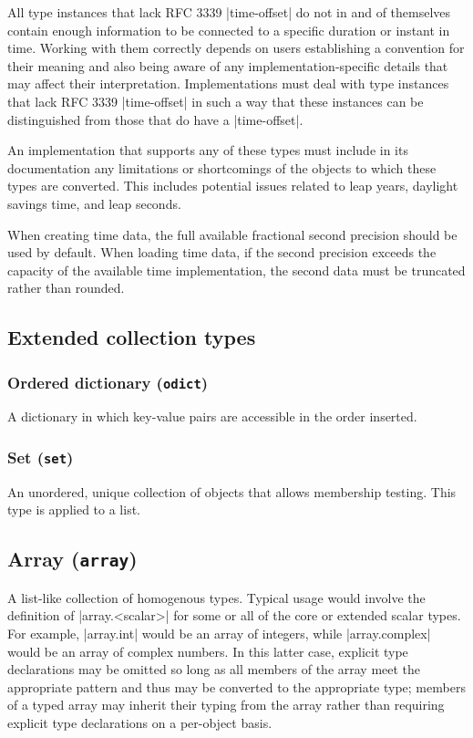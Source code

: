 \documentclass[11pt]{article}
\begin{document}
All type instances that lack RFC 3339 |time-offset| do not in and of themselves contain enough information to be connected to a specific duration or instant in time.  Working with them correctly depends on users establishing a convention for their meaning and also being aware of any implementation-specific details that may affect their interpretation.  Implementations must deal with type instances that lack RFC 3339 |time-offset| in such a way that these instances can be distinguished from those that do have a |time-offset|.

An implementation that supports any of these types must include in its documentation any limitations or shortcomings of the objects to which these types are converted.  This includes potential issues related to leap years, daylight savings time, and leap seconds.

When creating time data, the full available fractional second precision should be used by default.  When loading time data, if the second precision exceeds the capacity of the available time implementation, the second data must be truncated rather than rounded.



\subsection{Extended collection types}

\subsubsection{Ordered dictionary (\texttt{odict})}

A dictionary in which key-value pairs are accessible in the order inserted.


\subsubsection{Set (\texttt{set})}

An unordered, unique collection of objects that allows membership testing.  This type is applied to a list.


\subsection{Array (\texttt{array})}

A list-like collection of homogenous types.  Typical usage would involve the definition of |array.<scalar>| for some or all of the core or extended scalar types.  For example, |array.int| would be an array of integers, while |array.complex| would be an array of complex numbers.  In this latter case, explicit type declarations may be omitted so long as all members of the array meet the appropriate pattern and thus may be converted to the appropriate type; members of a typed array may inherit their typing from the array rather than requiring explicit type declarations on a per-object basis.
\end{document}
